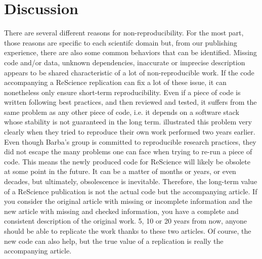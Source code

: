 \documentclass[a4paper,10pt, twocolumn]{article}
\begin{document}
\section*{Discussion}


There are several different reasons for non-reproducibility. For the most part,
those reasons are specific to each scientifc domain but, from our publishing
experience, there are also some common behaviors that can be identified.
Missing code and/or data, unknown dependencies, inaccurate or imprecise
description appears to be shared characteristic of a lot of non-reproducible
work. If the code accompanying a ReScience replication can fix a lot of these
issue, it can nonetheless only ensure short-term reproducibility. Even if a
piece of code is written following best practices, and then reviewed and
tested, it suffers from the same problem as any other piece of code, i.e. it
depends on a software stack whose stability is not guaranteed in the long
term. \citep{Mesnard:2016} illustrated this problem very clearly when they
tried to reproduce their own work performed two years earlier. Even though
Barba's group is committed to reproducible research practices, they did not
escape the many problems one can face when trying to re-run a piece of code.
This means the newly produced code for ReScience will likely be obsolete at
some point in the future. It can be a matter of months or years, or even
decades, but ultimately, obsolescence is inevitable. Therefore, the long-term
value of a ReScience publication is not the actual code but the accompanying
article. If you consider the original article with missing or incomplete
information and the new article with missing and checked information, you have
a complete and consistent description of the original work. 5, 10 or 20 years
from now, anyone should be able to replicate the work thanks to these two
articles. Of course, the new code can also help, but the true value of a
replication is really the accompanying article.\\
\end{document}
